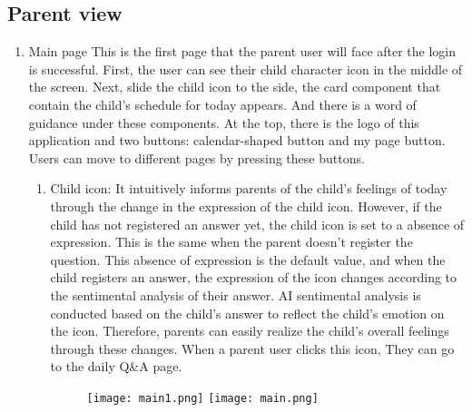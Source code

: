 \documentclass[conference]{IEEEtran}
\begin{document}
    \subsection{Parent view}
    \begin{enumerate}
    \item Main page \hfill \break
            This is the first page that the parent user will face after the login is successful. First, the user can see their child character icon in the middle of the screen. Next, slide the child icon to the side, the card component that contain the child’s schedule for today appears. And there is a word of guidance under these components. At the top, there is the logo of this application and two buttons: calendar-shaped button and my page button. Users can move to different pages by pressing these buttons.
            \begin{enumerate}
                \item Child icon:
                It intuitively informs parents of the child's feelings of today through the change in the expression of the child icon. However, if the child has not registered an answer yet, the child icon is set to a absence of expression. This is the same when the parent doesn’t register the question. This absence of expression is the default value, and when the child registers an answer, the expression of the icon changes according to the sentimental analysis of their answer. AI sentimental analysis is conducted based on the child's answer to reflect the child's emotion on the icon. Therefore, parents can easily realize the child's overall feelings through these changes. When a parent user clicks this icon, They can go to the daily Q\&A page.
                \begin{figure}[H]
                 \centering
                 \texttt{[image: main1.png]}
                 \texttt{[image: main.png]}
                 \end{figure}
                

\end{enumerate}
\end{enumerate}
\end{document}
